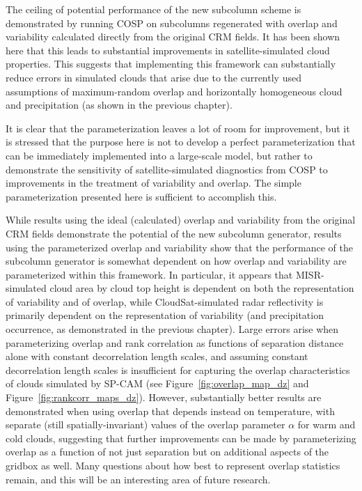 The ceiling of potential performance of the new subcolumn scheme is
demonstrated by running COSP on subcolumns regenerated with overlap and
variability calculated directly from the original CRM fields. It has
been shown here that this leads to substantial improvements in
satellite-simulated cloud properties. This suggests that implementing
this framework can substantially reduce errors in simulated clouds that
arise due to the currently used assumptions of maximum-random overlap
and horizontally homogeneous cloud and precipitation (as shown in the
previous chapter).

It is clear that the parameterization leaves a lot of room for
improvement, but it is stressed that the purpose here is not to develop
a perfect parameterization that can be immediately implemented into a
large-scale model, but rather to demonstrate the sensitivity of
satellite-simulated diagnostics from COSP to improvements in the
treatment of variability and overlap. The simple parameterization
presented here is sufficient to accomplish this.

While results using the ideal (calculated) overlap and variability from
the original CRM fields demonstrate the potential of the new subcolumn
generator, results using the parameterized overlap and variability show
that the performance of the subcolumn generator is somewhat dependent on
how overlap and variability are parameterized within this framework. In
particular, it appears that MISR-simulated cloud area by cloud top
height is dependent on both the representation of variability and of
overlap, while CloudSat-simulated radar reflectivity is primarily
dependent on the representation of variability (and precipitation
occurrence, as demonstrated in the previous chapter). Large errors arise
when parameterizing overlap and rank correlation as functions of
separation distance alone with constant decorrelation length scales, and
assuming constant decorrelation length scales is insufficient for
capturing the overlap characteristics of clouds simulated by SP-CAM (see
Figure~\ref{fig:overlap_map_dz} and Figure~\ref{fig:rankcorr_maps_dz}).
However, substantially better results are demonstrated when using
overlap that depends instead on temperature, with separate (still
spatially-invariant) values of the overlap parameter \(\alpha\) for warm
and cold clouds, suggesting that further improvements can be made by
parameterizing overlap as a function of not just separation but on
additional aspects of the gridbox as well. Many questions about how best
to represent overlap statistics remain, and this will be an interesting
area of future research.

